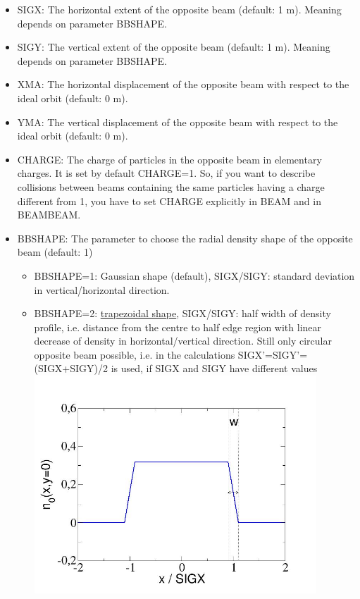 \begin{itemize}
   \item SIGX:
     The horizontal extent of the opposite beam (default: 1 m).
     Meaning depends on parameter BBSHAPE.
   \item SIGY:
     The vertical extent of the opposite beam (default: 1 m).
     Meaning depends on parameter BBSHAPE.
   \item XMA:
     The horizontal displacement of the opposite beam with respect to
     the ideal orbit (default: 0 m).
   \item YMA:
     The vertical displacement of the opposite beam with respect to
     the ideal orbit (default: 0 m).
   \item CHARGE:
     The charge of particles in the opposite beam in elementary charges. 
     It is set by default CHARGE=1. So, if you want to describe collisions 
     between beams containing the same particles having a charge different 
     from 1, you have to set CHARGE explicitly in BEAM and 
     in BEAMBEAM. 
   \item BBSHAPE: The parameter to choose the radial density shape of the 
     opposite beam (default: 1)
     \begin{itemize}
       \item  BBSHAPE=1: Gaussian shape (default), SIGX/SIGY: standard deviation in 
         vertical/horizontal direction.
	\item  BBSHAPE=2: \href{beambeam_n_trapez.jpg}{trapezoidal shape}, 
          SIGX/SIGY: half width of density profile,
          i.e. distance from the centre to half edge region with linear decrease of 
          density in horizontal/vertical direction. Still only circular opposite beam 
          possible, i.e. in the calculations 
          SIGX'=SIGY'=(SIGX+SIGY)/2 is used, if SIGX and SIGY have
          different values 
\\
\includegraphics[width=400px]{Introduction/beambeam_n_trapez.jpg}

\end{itemize}
\end{itemize}
